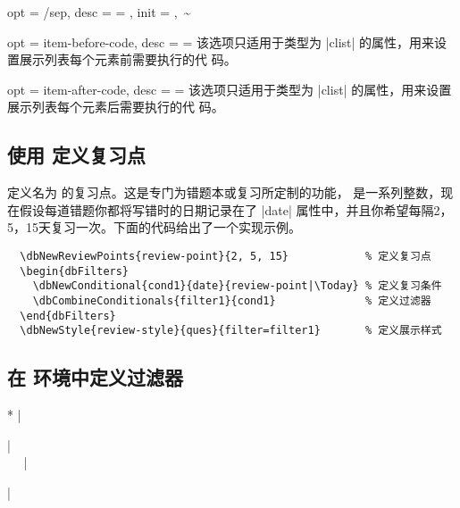 \documentclass[full]{l3doc}
\begin{document}
\begin{documentation}
\begin{option}{
  opt = {/sep},
  desc = {= },
  init = {,~\~}
}
\end{option}

\begin{option}{
  opt = item-before-code,
  desc = {= }
}
  该选项只适用于类型为 |clist| 的属性，用来设置展示列表每个元素前需要执行的代
  码。
\end{option}

\begin{option}{
  opt = item-after-code,
  desc = {= }
}
  该选项只适用于类型为 |clist| 的属性，用来设置展示列表每个元素后需要执行的代
  码。
\end{option}

\subsection{使用  定义复习点}

\begin{function}{\dbNewReviewPoints}
  \begin{syntax}
      
  \end{syntax}

  定义名为  的复习点。这是专门为错题本或复习所定制的功能，
  是一系列整数，现在假设每道错题你都将写错时的日期记录在了 |date|
  属性中，并且你希望每隔2，5，15天复习一次。下面的代码给出了一个实现示例。
\begin{verbatim}
  \dbNewReviewPoints{review-point}{2, 5, 15}            % 定义复习点
  \begin{dbFilters}
    \dbNewConditional{cond1}{date}{review-point|\Today} % 定义复习条件
    \dbCombineConditionals{filter1}{cond1}              % 定义过滤器
  \end{dbFilters}
  \dbNewStyle{review-style}{ques}{filter=filter1}       % 定义展示样式
\end{verbatim}
\end{function}

\subsection{在  环境中定义过滤器}

\noindent{}
\begin{Syntax}*
  |\begin{dbFilters}| \\
  ~~
  |\end{dbFilters}| \\
\end{Syntax}


\end{documentation}
\end{document}
